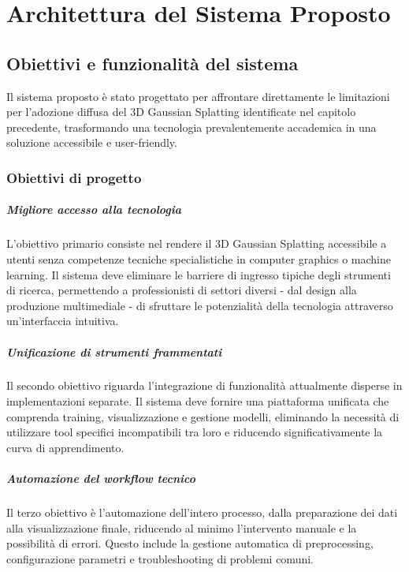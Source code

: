 \chapter{Architettura del Sistema Proposto}
\label{chap:architettura}

\section{Obiettivi e funzionalità del sistema}
Il sistema proposto è stato progettato per affrontare direttamente le limitazioni per l'adozione diffusa del 3D Gaussian Splatting identificate nel capitolo precedente, trasformando una tecnologia prevalentemente accademica in una soluzione accessibile e user-friendly.

\subsection{Obiettivi di progetto}

\paragraph{Migliore accesso alla tecnologia}
L'obiettivo primario consiste nel rendere il 3D Gaussian Splatting accessibile a utenti senza competenze tecniche specialistiche in computer graphics o machine learning. Il sistema deve eliminare le barriere di ingresso tipiche degli strumenti di ricerca, permettendo a professionisti di settori diversi - dal design alla produzione multimediale - di sfruttare le potenzialità della tecnologia attraverso un'interfaccia intuitiva.

\paragraph{Unificazione di strumenti frammentati}
Il secondo obiettivo riguarda l'integrazione di funzionalità attualmente disperse in implementazioni separate. Il sistema deve fornire una piattaforma unificata che comprenda training, visualizzazione e gestione modelli, eliminando la necessità di utilizzare tool specifici incompatibili tra loro e riducendo significativamente la curva di apprendimento.

\paragraph{Automazione del workflow tecnico}
Il terzo obiettivo è l'automazione dell'intero processo, dalla preparazione dei dati alla visualizzazione finale, riducendo al minimo l'intervento manuale e la possibilità di errori. Questo include la gestione automatica di preprocessing, configurazione parametri e troubleshooting di problemi comuni.

